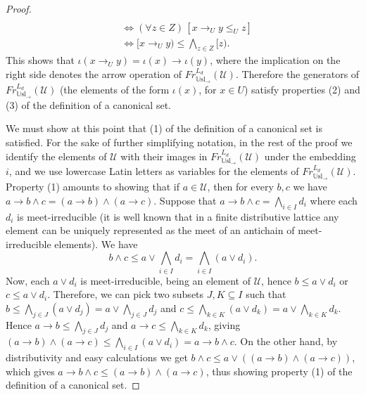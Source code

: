 \documentclass[11pt]{amsart}
\newcommand{\Usl}{\mathbb{U}\textrm{sl}}
\newcommand{\QA}[1]{(\forall{#1})\,}
\begin{document}
\begin{proof}
\begin{align*}
[y) \leq [x) \lor \bigwedge_{z \in Z} [z) 
      &\Leftrightarrow \QA{z \in Z} [y \leq_U x \lor_U z]\\
      &\Leftrightarrow \QA{z \in Z}[x\rightarrow_U y \leq_U z]\\
      &\Leftrightarrow [x \rightarrow_U  y) \leq \bigwedge_{z \in Z} [z) .
\end{align*}
This shows that $\iota(x \rightarrow_U  y)=\iota(x) \rightarrow \iota(y)$, 
where the implication on the right side denotes the arrow operation of 
$Fr^{L_d}_{\Usl_{\rightarrow}} (\mathscr{U})$. Therefore the generators of 
$Fr^{L_d}_ {\Usl_{\rightarrow}}(\mathscr{U})$ (the elements of the form 
$\iota(x)$, for $x \in U$) satisfy properties (2) and (3) of the definition 
of a canonical set. 
  
We must show at this point that (1) of the definition of a canonical set is 
satisfied. For the sake of further simplifying notation, in the rest of the 
proof we identify the elements of $\mathscr{U}$ with their images in 
$Fr^{L_d}_{\Usl_{\rightarrow}}(\mathscr{U})$ under the embedding $i$, and we 
use lowercase Latin letters as variables for the elements of 
$Fr^{L_d}_{\Usl_{\rightarrow}}(\mathscr{U})$. Property (1) amounts to showing 
that if $a\in \mathscr{U}$, then for every $b,c$ we have $a\rightarrow b\wedge 
c= (a\rightarrow b)\wedge (a\rightarrow c)$.  Suppose that $a \rightarrow b 
\wedge c=\bigwedge_{i \in I} d_i$ where each $d_i$ is meet-irreducible (it is 
well known that in a finite distributive lattice any element can be uniquely 
represented as the meet of an antichain of meet-irreducible elements). We 
have 
\[
b\wedge c \leq a \lor \bigwedge_{i \in I} d_i= \bigwedge_{i \in I} (a \lor d_i).
\] 
Now, each $a \lor d_i$ is meet-irreducible, being an element of $\mathscr{U}$, 
hence $b \leq a \lor d_i$ or $c \leq a \lor d_i$. Therefore, we can pick two 
subsets $J, K \subseteq I$ such that $b \leq \bigwedge_{j \in J} (a \lor 
d_j)=a \lor  \bigwedge_{j \in J} d_j$ and $c \leq \bigwedge_{k \in K} (a \lor 
d_k)=a \lor  \bigwedge_{k \in K} d_k$. Hence $a\rightarrow b \leq 
\bigwedge_{j \in J} d_j$ and $a\rightarrow c \leq \bigwedge_{k \in K} d_k$, 
giving $(a \rightarrow b) \wedge (a \rightarrow c)\leq \bigwedge_{i \in I} (a 
\lor d_i)=  a\rightarrow b\wedge c$. On the other hand, by distributivity and 
easy calculations we get $b \wedge c \leq a \lor ((a \rightarrow b) \wedge (a 
\rightarrow c))$, which gives $a \rightarrow b \wedge c \leq (a \rightarrow 
b) \wedge (a \rightarrow c)$, thus showing property (1) of the definition of 
a canonical set. 
\end{proof}  
\end{document}
